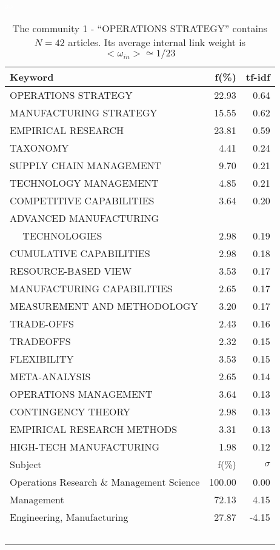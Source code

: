 \documentclass[a4paper,11pt]{report}
\begin{document}
\begin{landscape}
\begin{table}[!ht]
\caption{The community 1 - ``OPERATIONS STRATEGY'' contains $N = 42$ articles. Its average internal link weight is $<\omega_{in}> \simeq 1/23$ }
\textcolor{white}{aa}\\
{\scriptsize\begin{tabular}{|l r  r|}
\hline
Keyword & f(\%) & tf-idf \\
\hline
OPERATIONS STRATEGY & 22.93 & 0.64\\
MANUFACTURING STRATEGY & 15.55 & 0.62\\
EMPIRICAL RESEARCH & 23.81 & 0.59\\
TAXONOMY & 4.41 & 0.24\\
SUPPLY CHAIN MANAGEMENT & 9.70 & 0.21\\
TECHNOLOGY MANAGEMENT & 4.85 & 0.21\\
COMPETITIVE CAPABILITIES & 3.64 & 0.20\\
ADVANCED MANUFACTURING &  &\\
$\quad$ TECHNOLOGIES & 2.98 & 0.19\\
CUMULATIVE CAPABILITIES & 2.98 & 0.18\\
RESOURCE-BASED VIEW & 3.53 & 0.17\\
MANUFACTURING CAPABILITIES & 2.65 & 0.17\\
MEASUREMENT AND METHODOLOGY & 3.20 & 0.17\\
TRADE-OFFS & 2.43 & 0.16\\
TRADEOFFS & 2.32 & 0.15\\
FLEXIBILITY & 3.53 & 0.15\\
META-ANALYSIS & 2.65 & 0.14\\
OPERATIONS MANAGEMENT & 3.64 & 0.13\\
CONTINGENCY THEORY & 2.98 & 0.13\\
EMPIRICAL RESEARCH METHODS & 3.31 & 0.13\\
HIGH-TECH MANUFACTURING & 1.98 & 0.12\\
\hline
\hline
Subject & f(\%) & $\sigma$\\
\hline
Operations Research \& Management Science & 100.00 & 0.00\\
Management & 72.13 & 4.15\\
Engineering, Manufacturing & 27.87 & -4.15\\
 &  & \\
 &  & \\
 &  & \\
 &  & \\
 &  & \\

\end{tabular}}
\end{table}
\end{landscape}
\end{document}
